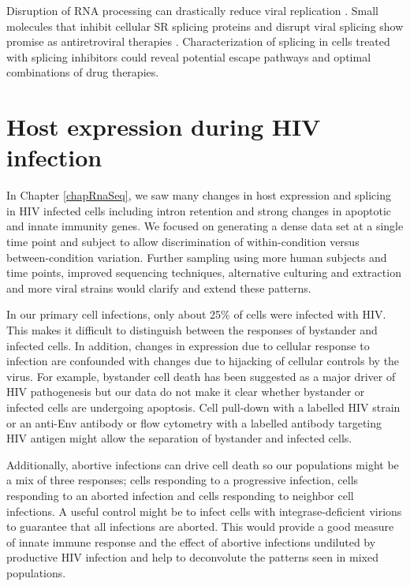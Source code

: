 \documentclass[../sherrill-Mix_thesis.tex]{subfiles}
\begin{document}
	Disruption of RNA processing can drastically reduce viral replication \citep{Wentz1997,Caputi2004,Madsen2005,Paca-Uccaralertkun2006,Mandal2008}. Small molecules that inhibit cellular SR splicing proteins and disrupt viral splicing show promise as antiretroviral therapies \citep{Fukuhara2006,Bakkour2007,Wong2011,Wong2013}. Characterization of splicing in cells treated with splicing inhibitors could reveal potential escape pathways and optimal combinations of drug therapies.

\section{Host expression during HIV infection} 
	In Chapter \ref{chapRnaSeq}, we saw many changes in host expression and splicing in HIV infected cells including intron retention and strong changes in apoptotic and innate immunity genes. We focused on generating a dense data set at a single time point and subject to allow discrimination of within-condition versus between-condition variation. Further sampling using more human subjects and time points, improved sequencing techniques, alternative culturing and extraction and more viral strains would clarify and extend these patterns.

	In our primary cell infections, only about 25\% of cells were infected with HIV. This makes it difficult to distinguish between the responses of bystander and infected cells. In addition, changes in expression due to cellular response to infection are confounded with changes due to hijacking of cellular controls by the virus. For example, bystander cell death has been suggested as a major driver of HIV pathogenesis \citep{Finkel1995,Doitsh2014} but our data do not make it clear whether bystander or infected cells are undergoing apoptosis. Cell pull-down with a labelled HIV strain \citep{Imbeault2009} or an anti-Env antibody \citep{Bahbouhi2004} or flow cytometry with a labelled antibody targeting HIV antigen \citep{Pace2012,Hrvatin2014} might allow the separation of bystander and infected cells. 

	Additionally, abortive infections can drive cell death \citep{Monroe2014,Doitsh2014} so our populations might be a mix of three responses; cells responding to a progressive infection, cells responding to an aborted infection and cells responding to neighbor cell infections. A useful control might be to infect cells with integrase-deficient virions to guarantee that all infections are aborted. This would provide a good measure of innate immune response and the effect of abortive infections undiluted by productive HIV infection and help to deconvolute the patterns seen in mixed populations.
\end{document}
